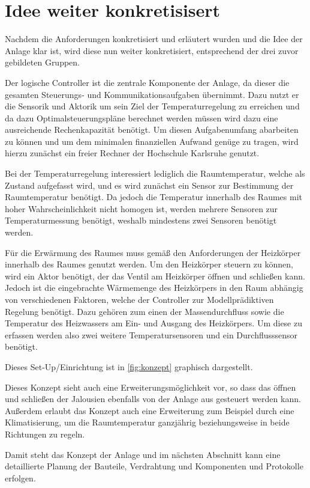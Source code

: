 \section{Idee weiter konkretisisert}

Nachdem die Anforderungen konkretisiert und erläutert wurden und die Idee der Anlage klar ist, wird diese nun weiter konkretisiert, entsprechend der drei zuvor gebildeten Gruppen.

Der logische Controller ist die zentrale Komponente der Anlage, da dieser die gesamten Steuerungs- und Kommunikationsaufgaben übernimmt. Dazu nutzt er die Sensorik und Aktorik um sein Ziel der Temperaturregelung zu erreichen und da dazu Optimalsteuerungspläne berechnet werden müssen wird dazu eine ausreichende Rechenkapazität benötigt. Um diesen Aufgabenumfang abarbeiten zu können und um dem minimalen finanziellen Aufwand genüge zu tragen, wird hierzu zunächst ein freier Rechner der Hochschule Karlsruhe genutzt.

Bei der Temperaturregelung interessiert lediglich die Raumtemperatur, welche als Zustand aufgefasst wird, und es wird zunächst ein Sensor zur Bestimmung der Raumtemperatur benötigt. Da jedoch die Temperatur innerhalb des Raumes mit hoher Wahrscheinlichkeit nicht homogen ist, werden mehrere Sensoren zur Temperaturmessung benötigt, weshalb mindestens zwei Sensoren benötigt werden.

Für die Erwärmung des Raumes muss gemäß den Anforderungen der Heizkörper innerhalb des Raumes genutzt werden. Um den Heizkörper steuern zu können, wird ein Aktor benötigt, der das Ventil am Heizkörper öffnen und schließen kann. Jedoch ist die eingebrachte Wärmemenge des Heizkörpers in den Raum abhängig von verschiedenen Faktoren, welche der Controller zur Modellprädiktiven Regelung benötigt. Dazu gehören zum einen der Massendurchfluss sowie die Temperatur des Heizwassers am Ein- und Ausgang des Heizkörpers. Um diese zu erfassen werden also zwei weitere Temperatursensoren und ein Durchflusssensor benötigt.

Dieses Set-Up/Einrichtung ist in \ref{fig:konzept} graphisch dargestellt.

Dieses Konzept sieht auch eine Erweiterungsmöglichkeit vor, so dass das öffnen und schließen der Jalousien ebenfalls von der Anlage aus gesteuert werden kann. Außerdem erlaubt das Konzept auch eine Erweiterung zum Beispiel durch eine Klimatisierung, um die Raumtemperatur ganzjährig beziehungsweise in beide Richtungen zu regeln.

Damit steht das Konzept der Anlage und im nächsten Abschnitt kann eine detaillierte Planung der Bauteile, Verdrahtung und Komponenten und Protokolle erfolgen.


